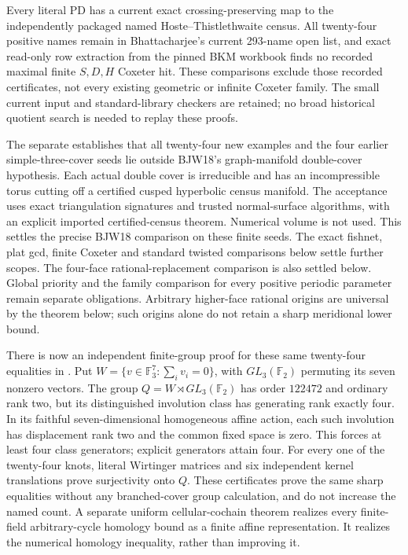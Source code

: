 \documentclass[11pt]{article}
\newcommand{\F}{\mathbb F}
\begin{document}
{Every literal PD has a current exact crossing-preserving map to the
independently packaged named Hoste--Thistlethwaite census. All
twenty-four positive names remain in Bhattacharjee's current
293-name open list, and exact read-only row extraction from the
pinned BKM workbook finds no recorded maximal finite $S,D,H$
Coxeter hit. These comparisons exclude those recorded certificates,
not every existing geometric or infinite Coxeter family.
The small current input and standard-library checkers are retained;
no broad historical quotient search is needed to replay these proofs.

The separate  establishes that all
twenty-four new examples and the four earlier simple-three-cover
seeds lie outside BJW18's graph-manifold double-cover hypothesis.
Each actual double cover is irreducible and has an incompressible
torus cutting off a certified cusped hyperbolic census manifold.
The acceptance uses exact triangulation signatures and trusted
normal-surface algorithms, with an explicit imported certified-census
theorem. Numerical volume is not used. This settles the precise
BJW18 comparison on these finite seeds. The exact fishnet, plat gcd,
finite Coxeter and standard twisted comparisons below settle further
scopes. The four-face rational-replacement comparison is also settled
below. Global priority and the family comparison for every positive
periodic parameter remain separate obligations. Arbitrary higher-face
rational origins are universal by the theorem below; such origins alone
do not retain a sharp meridional lower bound.

There is now an independent finite-group proof for these same
twenty-four equalities in .
Put $W=\{v\in\F_3^7:\sum_i v_i=0\}$, with
$GL_3(\F_2)$ permuting its seven nonzero vectors. The group
$Q=W\rtimes GL_3(\F_2)$ has order $122472$ and ordinary rank two,
but its distinguished involution class has generating rank exactly four.
In its faithful seven-dimensional homogeneous affine action, each such
involution has displacement rank two and the common fixed space is zero.
This forces at least four class generators; explicit generators attain
four. For every one of the twenty-four knots, literal Wirtinger matrices
and six independent kernel translations prove surjectivity onto $Q$.
These certificates prove the same sharp equalities without any
branched-cover group calculation, and do not increase the named count.
A separate uniform cellular-cochain theorem realizes every finite-field
arbitrary-cycle homology bound as a finite affine representation. It
realizes the numerical homology inequality, rather than improving it.

}
\end{document}

